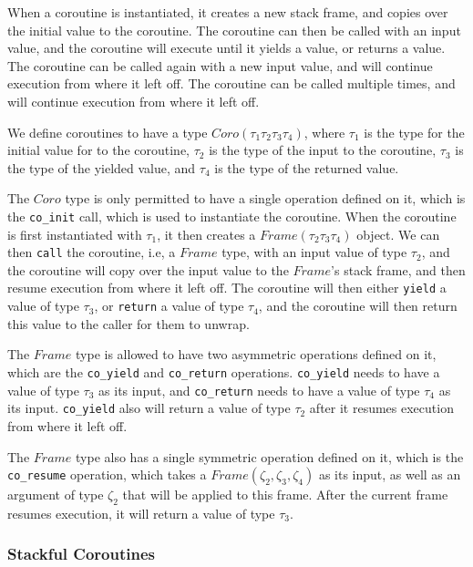 \documentclass[review,twocolumn,preprint]{sigplanconf}
\begin{document}
When a coroutine is instantiated, it creates a new stack frame, and copies over the initial value to the coroutine. The coroutine can then be called with an input value, and the coroutine will execute until it yields a value, or returns a value. The coroutine can be called again with a new input value, and will continue execution from where it left off. The coroutine can be called multiple times, and will continue execution from where it left off.

We define coroutines to have a type $Coro({\tau_1}{\tau_2}{\tau_3}{\tau_4})$, where $\tau_1$ is the type for the initial value for to the coroutine, $\tau_2$ is the type of the input to the coroutine, $\tau_3$ is the type of the yielded value, and $\tau_4$ is the type of the returned value.

The $Coro$ type is only permitted to have a single operation defined on it, which is the \verb!co_init! call, which is used to instantiate the coroutine. When the coroutine is first instantiated with $\tau_1$, it then creates a $Frame({\tau_2}{\tau_3}{\tau_4})$ object. We can then \verb!call! the coroutine, i.e, a $Frame$ type, with an input value of type $\tau_2$, and the coroutine will copy over the input value to the $Frame$'s stack frame, and then resume execution from where it left off. The coroutine will then either \verb!yield! a value of type $\tau_3$, or \verb!return! a value of type $\tau_4$, and the coroutine will then return this value to the caller for them to unwrap.

The $Frame$ type is allowed to have two asymmetric operations defined on it, which are the \verb!co_yield! and \verb!co_return! operations. \verb!co_yield! needs to have a value of type $\tau_3$ as its input, and \verb!co_return! needs to have a value of type $\tau_4$ as its input. \verb!co_yield! also will return a value of type $\tau_2$ after it resumes execution from where it left off.

The $Frame$ type also has a single symmetric operation defined on it, which is the \verb!co_resume! operation, which takes a $Frame({\zeta_2}, {\zeta_3}, {\zeta_4})$ as its input, as well as an argument of type $\zeta_2$ that will be applied to this frame. After the current frame resumes execution, it will return a value of type $\tau_3$.


\subsubsection{Stackful Coroutines}
\end{document}

